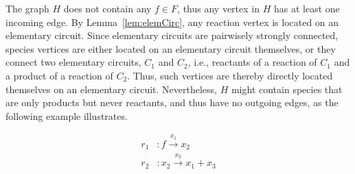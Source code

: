 \documentclass[pdflatex]{sn-jnl}
\theoremstyle{thmstyleone}%
\theoremstyle{examplesty}%
\theoremstyle{thmstylethree}%
\begin{document}
The graph $H$ does not contain any $f\in F$, thus any vertex in $H$ has at least one incoming edge. By Lemma~\ref{lem:elemCirc}, 
any reaction vertex is located on an elementary circuit. Since elementary circuits are pairwisely strongly connected, species vertices
are either located on an elementary circuit themselves, or they connect two elementary circuits, $C_1$ and $C_2$, i.e., reactants of
a reaction of $C_1$ and a product of a reaction of $C_2$. Thus, such vertices are thereby directly located themselves on an elementary 
circuit. Nevertheless, $H$ might contain species that are only products but never reactants, and thus have no outgoing edges, as the 
following example illustrates. 
\begin{figure}[h]
	\centering
	\begin{minipage}[c]{0.3\textwidth}
		\begin{equation}
			\begin{split}
				r_1& : f \overset{x_1}{\longrightarrow} x_2 \\
				r_2& : x_2 \overset{x_2}{\longrightarrow} x_1 + x_3
			\end{split}
		\end{equation}
	\end{minipage}%
	\hfill%
	\begin{minipage}[c]{0.23\textwidth}
		\centering
	\end{minipage}%
	\hfill%
	\begin{minipage}[c]{0.23\textwidth}
		\centering
\end{minipage}
\end{figure}
\end{document}
